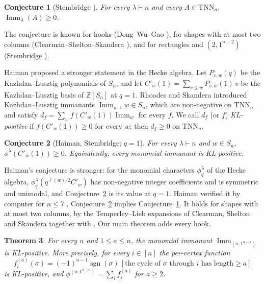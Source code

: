 \documentclass[11pt]{amsart}
\newtheorem{theorem}{Theorem}[section]
\newtheorem{conjecture}[theorem]{Conjecture}
\theoremstyle{definition}
\theoremstyle{remark}
\newcommand{\Z}{\mathbb{Z}}
\newcommand{\Imm}{\operatorname{Imm}}
\newcommand{\TNN}{\mathrm{TNN}}
\newcommand{\sgn}{\operatorname{sgn}}
\newcommand{\Cp}[1]{C'_{#1}(1)}
\begin{document}
\begin{conjecture}[Stembridge {\cite[Conj.~2.1]{Ste92}}]\label{conj:MN}
For every $\lambda\vdash n$ and every $A\in\TNN_n$, $\Imm_\lambda(A)\ge 0$.
\end{conjecture}

The conjecture is known for hooks (Dong--Wu--Gao \cite{DWG}), for shapes with at most two columns (Clearman--Shelton--Skandera \cite{CSS}), and for rectangles and $(2,1^{n-2})$ (Stembridge \cite{Ste92}).

Haiman \cite{Hai} proposed a stronger statement in the Hecke algebra. Let $P_{v,w}(q)$ be the Kazhdan--Lusztig polynomials of $S_n$, and let $\Cp w=\sum_{v\le w}P_{v,w}(1)\,v$ be the Kazhdan--Lusztig basis of $\Z[S_n]$ at $q=1$. Rhoades and Skandera \cite{RS06} introduced Kazhdan--Lusztig immanants $\Imm_w$, $w\in S_n$, which are non-negative on $\TNN_n$ and satisfy $d_f=\sum_wf(\Cp w)\Imm_w$ for every $f$. We call $d_f$ (or $f$) \emph{KL-positive} if $f(\Cp w)\ge0$ for every $w$; then $d_f\ge0$ on $\TNN_n$.

\begin{conjecture}[Haiman, Stembridge; $q=1$]\label{conj:H}
For every $\lambda\vdash n$ and $w\in S_n$, $\phi^\lambda(\Cp w)\ge 0$. Equivalently, every monomial immanant is KL-positive.
\end{conjecture}

Haiman's conjecture \cite[Conj.~2.1]{Hai} is stronger: for the monomial characters $\phi^\lambda_q$ of the Hecke algebra, $\phi^\lambda_q(q^{\ell(w)/2}C'_w)$ has non-negative integer coefficients and is symmetric and unimodal, and Conjecture~\ref{conj:H} is its value at $q=1$. Haiman verified it by computer for $n\le7$ \cite[\S4]{Hai}. Conjecture~\ref{conj:H} implies Conjecture~\ref{conj:MN}. It holds for shapes with at most two columns, by the Temperley--Lieb expansions of Clearman, Shelton and Skandera \cite{CSS} together with \cite[Prop.~3.2]{RS06}. Our main theorem adds every hook.

\begin{theorem}\label{thm:main}
For every $n$ and $1\le a\le n$, the monomial immanant $\Imm_{(a,1^{n-a})}$ is KL-positive. More precisely, for every $i\in[n]$ the per-vertex function
\[
f^{(a)}_i(\sigma)=(-1)^{a-1}\sgn(\sigma)\,[\text{the cycle of $\sigma$ through $i$ has length}\ge a]
\]
is KL-positive, and $\phi^{(a,1^{n-a})}=\sum_if^{(a)}_i$ for $a\ge2$.
\end{theorem}
\end{document}
